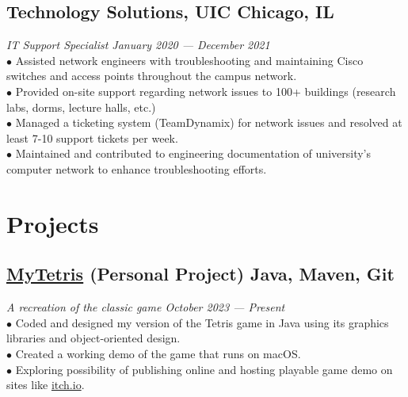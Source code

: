 \documentclass{article}
\begin{document}
\subsection{Technology Solutions, UIC \hfill \textnormal{Chicago, IL}}
\vspace{-0.5em}
\textit{IT Support Specialist \hfill January 2020 --- December 2021}
\\
$\bullet$ Assisted network engineers with troubleshooting and maintaining Cisco switches and access points throughout the campus network.
\\
$\bullet$ Provided on-site support regarding network issues to 100+ buildings (research labs, dorms, lecture halls, etc.)
\\
$\bullet$ Managed a ticketing system (TeamDynamix) for network issues and resolved at least 7-10 support tickets per week.
\\
$\bullet$ Maintained and contributed to engineering documentation of university's computer network to enhance troubleshooting efforts.


\section{Projects}
\subsection{\href{https://github.com/IanLulu/MyTetris}{\underline{MyTetris}} (Personal Project) \hfill \textnormal{Java, Maven, Git}}
\vspace{-0.5em}
\textit{A recreation of the classic game \hfill October 2023 --- Present}
\\
$\bullet$ Coded and designed my version of the Tetris game in Java using its graphics libraries and object-oriented design.
\\
$\bullet$ Created a working demo of the game that runs on macOS.
\\
$\bullet$ Exploring possibility of publishing online and hosting playable game demo on sites like \url{itch.io}.
\vspace{-0.5em}
\end{document}

